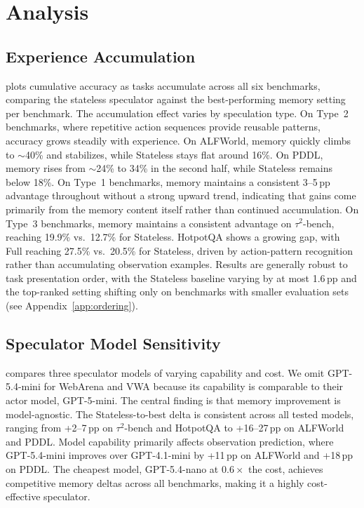 \documentclass{article}
\begin{document}
\section{Analysis}
\label{sec:analysis}

\subsection{Experience Accumulation}



 plots cumulative accuracy as tasks accumulate across all six benchmarks, comparing the stateless speculator against the best-performing memory setting per benchmark. The accumulation effect varies by speculation type. On Type~2 benchmarks, where repetitive action sequences provide reusable patterns, accuracy grows steadily with experience. On ALFWorld, memory quickly climbs to $\sim$40\% and stabilizes, while Stateless stays flat around 16\%. On PDDL, memory rises from $\sim$24\% to 34\% in the second half, while Stateless remains below 18\%. On Type~1 benchmarks, memory maintains a consistent 3--5\,pp advantage throughout without a strong upward trend, indicating that gains come primarily from the memory content itself rather than continued accumulation. On Type~3 benchmarks, memory maintains a consistent advantage on $\tau^{2}$-bench, reaching 19.9\% vs.\ 12.7\% for Stateless. HotpotQA shows a growing gap, with Full reaching 27.5\% vs.\ 20.5\% for Stateless, driven by action-pattern recognition rather than accumulating observation examples. Results are generally robust to task presentation order, with the Stateless baseline varying by at most 1.6\,pp and the top-ranked setting shifting only on benchmarks with smaller evaluation sets (see Appendix~\ref{app:ordering}).

\subsection{Speculator Model Sensitivity}

 compares three speculator models of varying capability and cost. We omit GPT-5.4-mini for WebArena and VWA because its capability is comparable to their actor model, GPT-5-mini. The central finding is that memory improvement is model-agnostic. The Stateless-to-best delta is consistent across all tested models, ranging from +2--7\,pp on $\tau^{2}$-bench and HotpotQA to +16--27\,pp on ALFWorld and PDDL. Model capability primarily affects observation prediction, where GPT-5.4-mini improves over GPT-4.1-mini by +11\,pp on ALFWorld and +18\,pp on PDDL. The cheapest model, GPT-5.4-nano at $0.6\times$ the cost, achieves competitive memory deltas across all benchmarks, making it a highly cost-effective speculator.
\end{document}
